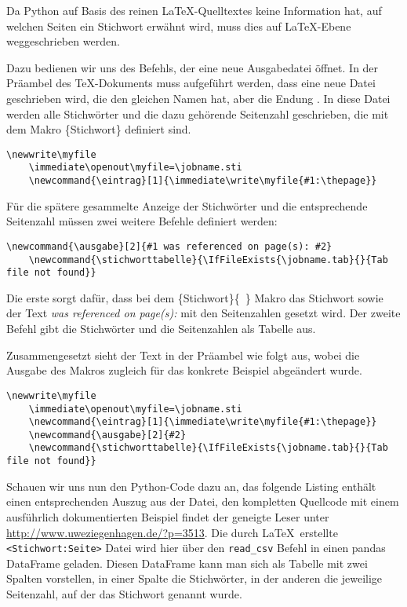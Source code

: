 \documentclass[ngerman]{dtk}
\newcommand{\eintrag}[1]{\immediate\write\myfile{#1:\thepage}}
\newcommand{\ausgabe}[2]{#2}
\newcommand{\stichworttabelle}{\IfFileExists{\jobname.tab}{}{Tab file not found}}
\begin{document}
Da Python auf Basis des reinen \LaTeX-Quelltextes keine Information hat, auf welchen Seiten ein Stichwort erwähnt wird, 
muss dies auf \LaTeX -Ebene weggeschrieben werden. 

Dazu bedienen wir uns des  Befehls, der eine neue Ausgabedatei öffnet.  In der Präambel des \TeX-Dokuments muss aufgeführt werden, dass eine neue Datei geschrieben wird, die den gleichen Namen hat, aber die Endung . In diese Datei werden alle Stichwörter und die dazu gehörende Seitenzahl geschrieben, 
die mit dem Makro \{Stichwort\}  definiert sind.
\begin{lstlisting}[style=nonumber]
	\newwrite\myfile
	\immediate\openout\myfile=\jobname.sti
	\newcommand{\eintrag}[1]{\immediate\write\myfile{#1:\thepage}}
\end{lstlisting}

Für die spätere gesammelte Anzeige der Stichwörter und die entsprechende Seitenzahl müssen zwei weitere Befehle definiert 
werden:

\begin{lstlisting}[style=nonumber]
	\newcommand{\ausgabe}[2]{#1 was referenced on page(s): #2}
	\newcommand{\stichworttabelle}{\IfFileExists{\jobname.tab}{}{Tab file not found}}
\end{lstlisting}

Die erste sorgt dafür, dass bei dem  \{Stichwort\}\{~\}  Makro das Stichwort sowie der Text 
\emph{was referenced on page(s):} mit den Seitenzahlen gesetzt wird. Der zweite Befehl gibt die Stichwörter und die Seitenzahlen als Tabelle aus.

Zusammengesetzt sieht der Text in der Präambel wie folgt aus,
wobei die Ausgabe des  Makros zugleich für das konkrete Beispiel abgeändert wurde.
\begin{lstlisting}[style=number]
	\newwrite\myfile
	\immediate\openout\myfile=\jobname.sti
	\newcommand{\eintrag}[1]{\immediate\write\myfile{#1:\thepage}}
	\newcommand{\ausgabe}[2]{#2}
	\newcommand{\stichworttabelle}{\IfFileExists{\jobname.tab}{}{Tab file not found}}
\end{lstlisting}

Schauen wir uns nun den Python-Code dazu an, das folgende Listing enthält einen entsprechenden Auszug aus der Datei, den kompletten Quellcode mit einem ausführlich dokumentierten Beispiel findet der geneigte Leser unter \url{http://www.uweziegenhagen.de/?p=3513}. Die durch \LaTeX\ erstellte \texttt{<Stichwort:Seite>} Datei wird hier über den \verb|read_csv| Befehl in einen pandas DataFrame geladen. Diesen DataFrame kann man sich als Tabelle mit zwei Spalten vorstellen, in einer Spalte die Stichwörter, in der anderen die jeweilige Seitenzahl, auf der das Stichwort genannt wurde. 
\end{document}
